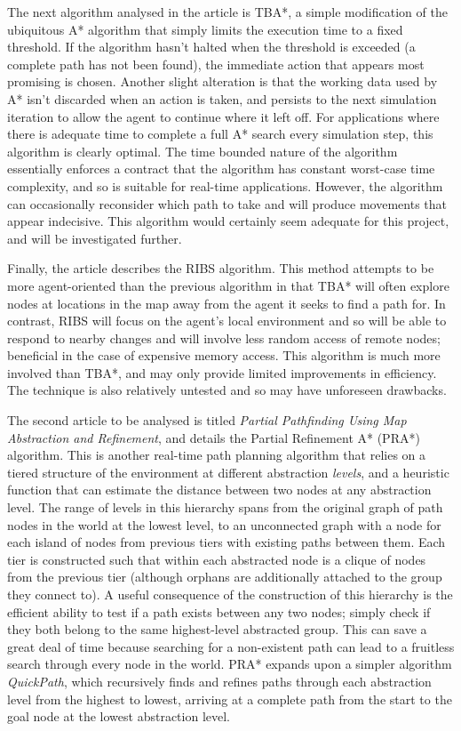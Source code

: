 \documentclass[12pt,a4paper]{article}
\begin{document}
The next algorithm analysed in the article is TBA*, a simple modification of the ubiquitous A* algorithm that simply limits the execution time to a fixed threshold. If the algorithm hasn't halted when the threshold is exceeded (a complete path has not been found), the immediate action that appears most promising is chosen. Another slight alteration is that the working data used by A* isn't discarded when an action is taken, and persists to the next simulation iteration to allow the agent to continue where it left off. For applications where there is adequate time to complete a full A* search every simulation step, this algorithm is clearly optimal. The time bounded nature of the algorithm essentially enforces a contract that the algorithm has constant worst-case time complexity, and so is suitable for real-time applications. However, the algorithm can occasionally reconsider which path to take and will produce movements that appear indecisive. This algorithm would certainly seem adequate for this project, and will be investigated further.

Finally, the article describes the RIBS algorithm. This method attempts to be more agent-oriented than the previous algorithm in that TBA* will often explore nodes at locations in the map away from the agent it seeks to find a path for. In contrast, RIBS will focus on the agent's local environment and so will be able to respond to nearby changes and will involve less random access of remote nodes; beneficial in the case of expensive memory access. This algorithm is much more involved than TBA*, and may only provide limited improvements in efficiency. The technique is also relatively untested and so may have unforeseen drawbacks.

The second article to be analysed is titled \emph{Partial Pathfinding Using Map Abstraction and Refinement}\cite{buro05}, and details the Partial Refinement A* (PRA*) algorithm. This is another real-time path planning algorithm that relies on a tiered structure of the environment at different abstraction \emph{levels}, and a heuristic function that can estimate the distance between two nodes at any abstraction level. The range of levels in this hierarchy spans from the original graph of path nodes in the world at the lowest level, to an unconnected graph with a node for each island of nodes from previous tiers with existing paths between them. Each tier is constructed such that within each abstracted node is a clique of nodes from the previous tier (although orphans are additionally attached to the group they connect to). A useful consequence of the construction of this hierarchy is the efficient ability to test if a path exists between any two nodes; simply check if they both belong to the same highest-level abstracted group. This can save a great deal of time because searching for a non-existent path can lead to a fruitless search through every node in the world. PRA* expands upon a simpler algorithm \emph{QuickPath}, which recursively finds and refines paths through each abstraction level from the highest to lowest, arriving at a complete path from the start to the goal node at the lowest abstraction level.
\end{document}
